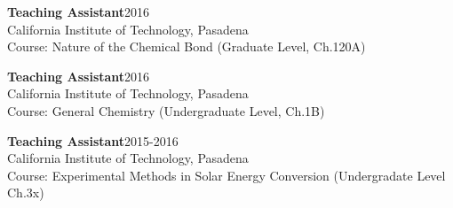 \documentclass[letterpaper]{article}
\renewenvironment{itemize}{
  \begin{list}{}{
    \setlength{\leftmargin}{1.5em}
  }
}{
  \end{list}
}
\begin{document}
\begin{itemize}
\item \textbf{Teaching Assistant}\hfill 2016\\
      California Institute of Technology, Pasadena \\
      Course: Nature of the Chemical Bond (Graduate Level, Ch.120A)
\item \textbf{Teaching Assistant}\hfill 2016\\
      California Institute of Technology, Pasadena \\
      Course: General Chemistry (Undergraduate Level, Ch.1B)
\item \textbf{Teaching Assistant}\hfill 2015-2016\\
      California Institute of Technology, Pasadena \\
      Course: Experimental Methods in Solar Energy Conversion (Undergradate
      Level Ch.3x)



\end{itemize}
\end{document}
